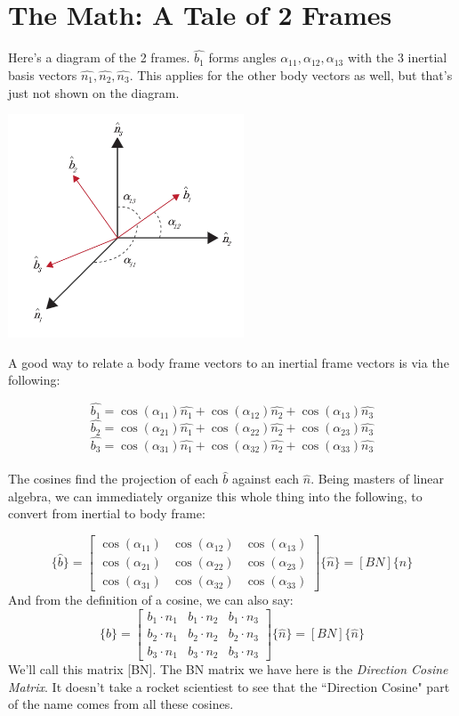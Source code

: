\documentclass[a4paper,14pt]{extreport}
\newcommand{\bv}[1]{\hat{b_{#1}}}
\newcommand{\nv}[1]{\hat{n_{#1}}}
\begin{document}
\section{The Math: A Tale of 2 Frames}
Here's a diagram of the 2 frames. $\bv{1}$ forms angles $\alpha_{11}, \alpha_{12}, \alpha_{13}$ with the 3 inertial basis vectors $\nv{1},\nv{2},\nv{3}$. This applies for the other body vectors as well, but that's just not shown on the diagram.
\begin{center}
\includegraphics[width=7cm]{dcmalpha}
\end{center}
A good way to relate a body frame vectors to an inertial frame vectors is via the following:

\[\bv{1} = \cos(\alpha_{11})\nv{1} + \cos(\alpha_{12})\nv{2} + \cos(\alpha_{13})\nv{3}\]
\[\bv{2} = \cos(\alpha_{21})\nv{1} + \cos(\alpha_{22})\nv{2} + \cos(\alpha_{23})\nv{3}\]
\[\bv{3} = \cos(\alpha_{31})\nv{1} + \cos(\alpha_{32})\nv{2} + \cos(\alpha_{33})\nv{3}\]
\\
The cosines find the projection of each $\hat{b}$ against each $\hat{n}$. Being masters of linear algebra, we can immediately organize this whole thing into the following, to convert from inertial to body frame:

\[
\{\hat{b}\} = \begin{bmatrix}
\cos(\alpha_{11})&\cos(\alpha_{12})&\cos(\alpha_{13}) \\
\cos(\alpha_{21})&\cos(\alpha_{22})&\cos(\alpha_{23}) \\
\cos(\alpha_{31})&\cos(\alpha_{32})&\cos(\alpha_{33})
\end{bmatrix} \{\hat{n}\} = [BN] \{\hat{n}\}
\]
And from the definition of a cosine, we can also say:
\[
\{\hat{b}\} = \begin{bmatrix}
b_1 \cdot n_1 & b_1 \cdot n_2 & b_1 \cdot n_3 \\
b_2 \cdot n_1 & b_2 \cdot n_2 & b_2 \cdot n_3 \\
b_3 \cdot n_1 & b_3 \cdot n_2 & b_3 \cdot n_3
\end{bmatrix} \{\hat{n}\} = [BN] \{\hat{n}\}
\]
We'll call this matrix [BN]. The BN matrix we have here is the \emph{Direction Cosine Matrix}. It doesn't take a rocket scientiest to see that the ``Direction Cosine" part of the name comes from all these cosines.
\end{document}
